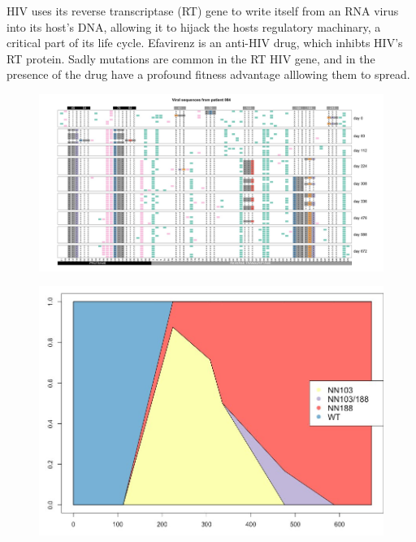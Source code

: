 HIV uses its reverse transcriptase (RT) gene to write itself from an RNA virus into its host's DNA, allowing it to hijack the hosts regulatory machinary, a critical part of its life cycle. 
Efavirenz is an anti-HIV drug, which inhibts HIV's RT protein. Sadly mutations are common in the RT HIV gene, and in the presence of the drug have a profound fitness advantage alllowing them to spread. 

\begin{figure}
\begin{center}
  \includegraphics[width =  \textwidth]{Journal_figs/recom_selection/Pleuni_HIV_interference/DdwdkVeVMAA7t-V.jpg}
\end{center}
\caption{} \label{fig:HIV_interference}  %
\end{figure}

\begin{figure}
\begin{center}
  \includegraphics[width = 0.8 \textwidth]{Journal_figs/recom_selection/Pleuni_HIV_interference/DdweQyxU0AA7mXe.jpg}
\end{center}
\caption{} \label{fig:HIV_interference_M}  %
\end{figure}


